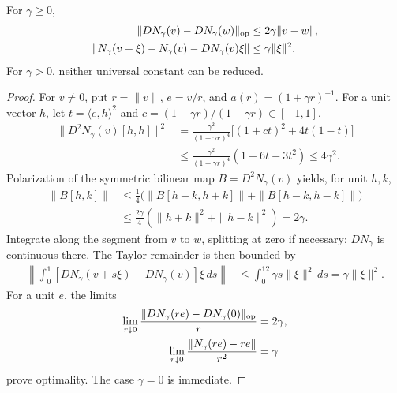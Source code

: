 \begin{proposition}
\label{prop:sharp-normalization-jacobian}
For $\gamma\ge0$,
\begin{align}
 \|DN_\gamma(v)-DN_\gamma(w)\|_{\rm op}&\le2\gamma\|v-w\|,\\
 \|N_\gamma(v+\xi)-N_\gamma(v)-DN_\gamma(v)\xi\|
 &\le\gamma\|\xi\|^2.
\end{align}
For $\gamma>0$, neither universal constant can be reduced.
\end{proposition}
\begin{proof}
For $v\ne0$, put $r=\|v\|$, $e=v/r$, and $a(r)=(1+\gamma r)^{-1}$. For a unit vector $h$, let $t=\langle e,h\rangle^2$ and $c=(1-\gamma r)/(1+\gamma r)\in[-1,1]$.
\begin{align}
 \|D^2N_\gamma(v)[h,h]\|^2
 &=\frac{\gamma^2}{(1+\gamma r)^4}
 \bigl[(1+ct)^2+4t(1-t)\bigr]\\
 &\le\frac{\gamma^2}{(1+\gamma r)^4}(1+6t-3t^2)
 \le4\gamma^2.
\end{align}
Polarization of the symmetric bilinear map $B=D^2N_\gamma(v)$ yields, for unit $h,k$,
\begin{align}
 \|B[h,k]\|
 &\le\tfrac14\bigl(\|B[h+k,h+k]\|+\|B[h-k,h-k]\|\bigr)\\
 &\le\tfrac{2\gamma}{4}(\|h+k\|^2+\|h-k\|^2)=2\gamma.
\end{align}
Integrate along the segment from $v$ to $w$, splitting at zero if necessary; $DN_\gamma$ is continuous there. The Taylor remainder is then bounded by
\begin{align}
 \left\|\int_0^1[DN_\gamma(v+s\xi)-DN_\gamma(v)]\xi\,ds\right\|
 &\le\int_0^12\gamma s\|\xi\|^2\,ds=\gamma\|\xi\|^2.
\end{align}
For a unit $e$, the limits
\begin{align}
 \lim_{r\downarrow0}\frac{\|DN_\gamma(re)-DN_\gamma(0)\|_{\rm op}}r&=2\gamma,\\
 \lim_{r\downarrow0}\frac{\|N_\gamma(re)-re\|}{r^2}&=\gamma
\end{align}
prove optimality. The case $\gamma=0$ is immediate.
\end{proof}

